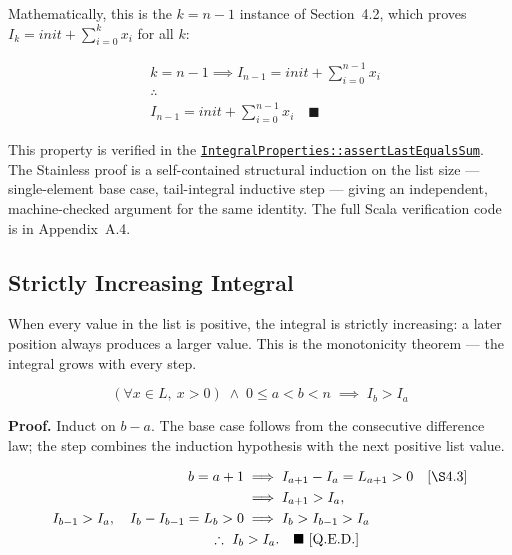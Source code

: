 Mathematically, this is the $k = n-1$ instance of Section~4.2, which
proves $I_k = init + \sum_{i=0}^{k} x_i$ for all $k$:

\begin{equation*}
\begin{aligned}
& k = n - 1 \implies I_{n-1} = init + \sum_{i=0}^{n-1} x_i \\
& \therefore \\
& I_{n-1} = init + \sum_{i=0}^{n-1} x_i \quad \blacksquare
\end{aligned}
\end{equation*}

{\raggedright
This property is verified in the
\href{https://github.com/thiagomata/prime-numbers/blob/master/src/main/scala/v1/chapter3/list/integral/properties/IntegralProperties.scala}{\texttt{IntegralProperties::\allowbreak assertLastEqualsSum}}.
The Stainless proof is a self-contained structural induction on the list
size --- single-element base case, tail-integral inductive step --- giving
an independent, machine-checked argument for the same identity. The full
Scala verification code is in Appendix~A.4.
\par}

\subsection{Strictly Increasing Integral}
\label{sec:strictly-increasing}

When every value in the list is positive, the integral is strictly
increasing: a later position always produces a larger value. This is the
monotonicity theorem --- the integral grows with every step.

\begin{equation*}
(\forall x \in L,\ x > 0) \;\land\; 0 \leq a < b < n
  \;\implies\; I_b > I_a
\end{equation*}

\textbf{Proof.} Induct on $b-a$. The base case follows from the
consecutive difference law; the step combines the induction hypothesis
with the next positive list value.

\begin{equation*}
\begin{aligned}
b=a+1 &\implies I_{a+1}-I_a=L_{a+1}>0 &&\text{[\S4.3]} \\
      &\implies I_{a+1}>I_a, \\
I_{b-1}>I_a,\quad I_b-I_{b-1}=L_b>0
      &\implies I_b>I_{b-1}>I_a \\
\therefore\ I_b &> I_a.
  \quad \blacksquare\ \text{[Q.E.D.]}
\end{aligned}
\end{equation*}

